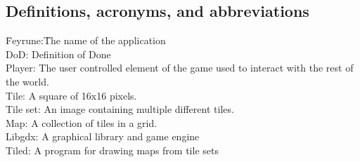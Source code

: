 \subsection{Definitions, acronyms, and abbreviations}
\begin{comment}
Create a word list to avoid confusion and give a definition of every abbreviation
you use in the document.
\end{comment}
\label{wordlist}
\begin{tabbing}
	\indent\= Feyrune:\indent\indent\= The name of the application\\
	\> DoD:\> Definition of Done\\
\> Player:\> The user controlled element of the game used to interact with the rest of the world.\\
	\> Tile:\> A square of 16x16 pixels.\\
	\> Tile set:\> An image containing multiple different tiles.\\
	\> Map:\> A collection of tiles in a grid.\\
	\> Libgdx:\> A graphical library and game engine\\
\> Tiled:\> A program for drawing maps from tile sets\\
\end{tabbing}